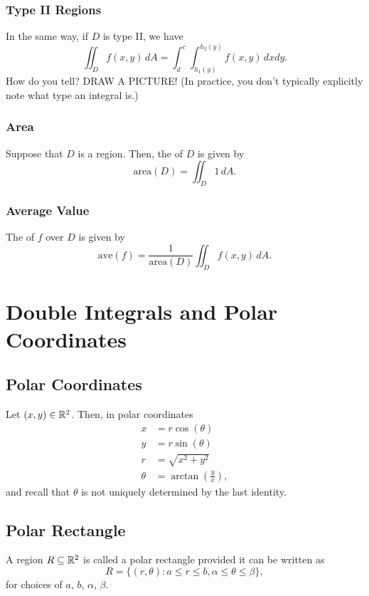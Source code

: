 \subsubsection{Type II Regions}

In the same way, if \(D\) is type II, we have
\[
  \iint_D f(x, y) \, dA = \int_d^c \int_{h_1(y)}^{h_2(y)} f(x, y) \, dx dy.
\]
How do you tell? DRAW A PICTURE! (In practice, you don’t typically explicitly note what type an integral is.)

\subsubsection{Area}

Suppose that \(D\) is a region. Then, the  of \(D\) is given by
\[
  \text{area}(D) = \iint_D 1 \, dA.
\]

\subsubsection{Average Value}

The  of \(f\) over \(D\) is given by
\[
  \text{ave}(f) = \frac{1}{\text{area}(D)} \iint_D f(x, y) \, dA.
\]

\newpage

\section{Double Integrals and Polar Coordinates}

\subsection{Polar Coordinates}

Let \((x, y) \in \mathbb{R}^2\). Then, in polar coordinates
\begin{align*}
  x & = r \cos(\theta) \\
  y & = r \sin(\theta)  \\
  r & = \sqrt{x^2 + y^2} \\
  \theta & = \arctan\left(\frac{y}{x}\right),
\end{align*}
and recall that \(\theta\) is not uniquely determined by the last identity.

\subsection{Polar Rectangle}

A region \(R \subseteq \mathbb{R}^2\) is called a polar rectangle provided it can be written as
\[
  R = \{(r, \theta) : a \leq r \leq b, \alpha \leq \theta \leq \beta\},
\]
for choices of \(a\), \(b\), \(\alpha\), \(\beta\). \\

